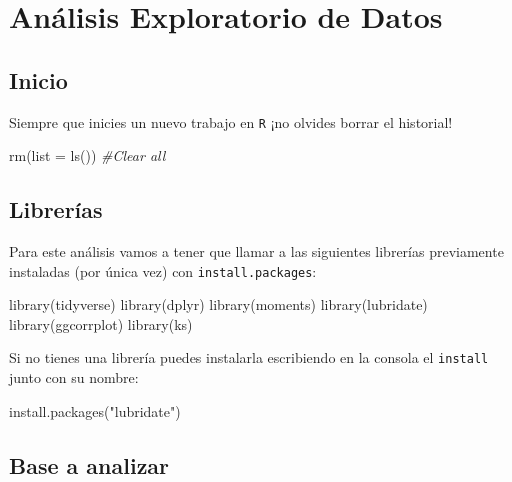 \documentclass[
]{book}
\newenvironment{Shaded}{\begin{snugshade}}{\end{snugshade}}
\newcommand{\AttributeTok}[1]{\textcolor[rgb]{0.77,0.63,0.00}{#1}}
\newcommand{\CommentTok}[1]{\textcolor[rgb]{0.56,0.35,0.01}{\textit{#1}}}
\newcommand{\FunctionTok}[1]{\textcolor[rgb]{0.00,0.00,0.00}{#1}}
\newcommand{\NormalTok}[1]{#1}
\newcommand{\StringTok}[1]{\textcolor[rgb]{0.31,0.60,0.02}{#1}}
\begin{document}
\hypertarget{anuxe1lisis-exploratorio-de-datos}{%
\chapter{Análisis Exploratorio de Datos}\label{anuxe1lisis-exploratorio-de-datos}}

\hypertarget{inicio}{%
\section{Inicio}\label{inicio}}

Siempre que inicies un nuevo trabajo en \texttt{R} ¡no olvides borrar el historial!

\begin{Shaded}
\begin{Highlighting}[]
\FunctionTok{rm}\NormalTok{(}\AttributeTok{list =} \FunctionTok{ls}\NormalTok{()) }\CommentTok{\#Clear all}
\end{Highlighting}
\end{Shaded}

\hypertarget{libreruxedas}{%
\section{Librerías}\label{libreruxedas}}

Para este análisis vamos a tener que llamar a las siguientes librerías previamente instaladas (por única vez) con \texttt{install.packages}:

\begin{Shaded}
\begin{Highlighting}[]
\FunctionTok{library}\NormalTok{(tidyverse)}
\FunctionTok{library}\NormalTok{(dplyr)}
\FunctionTok{library}\NormalTok{(moments)}
\FunctionTok{library}\NormalTok{(lubridate)}
\FunctionTok{library}\NormalTok{(ggcorrplot)}
\FunctionTok{library}\NormalTok{(ks)}
\end{Highlighting}
\end{Shaded}

Si no tienes una librería puedes instalarla escribiendo en la consola el \texttt{install} junto con su nombre:

\begin{Shaded}
\begin{Highlighting}[]
\FunctionTok{install.packages}\NormalTok{(}\StringTok{"lubridate"}\NormalTok{)}
\end{Highlighting}
\end{Shaded}

\hypertarget{base-a-analizar}{%
\section{Base a analizar}\label{base-a-analizar}}
\end{document}
